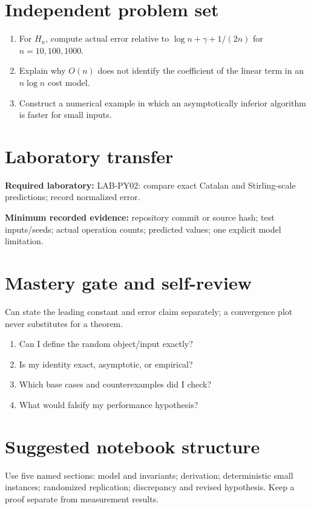 \documentclass[11pt]{article}
\begin{document}
\section{Independent problem set}
\begin{enumerate}
\item For $H_n$, compute actual error relative to $\log n+\gamma+1/(2n)$ for $n=10,100,1000$.
\item Explain why $O(n)$ does not identify the coefficient of the linear term in an $n\log n$ cost model.
\item Construct a numerical example in which an asymptotically inferior algorithm is faster for small inputs.
\end{enumerate}
\section{Laboratory transfer}
\textbf{Required laboratory:} LAB-PY02: compare exact Catalan and Stirling-scale predictions; record normalized error.\par
\noindent\textbf{Minimum recorded evidence:} repository commit or source hash; test inputs/seeds; actual operation counts; predicted values; one explicit model limitation.\par
\section{Mastery gate and self-review}
Can state the leading constant and error claim separately; a convergence plot never substitutes for a theorem.\par
\begin{enumerate}\item Can I define the random object/input exactly? \item Is my identity exact, asymptotic, or empirical? \item Which base cases and counterexamples did I check? \item What would falsify my performance hypothesis?\end{enumerate}
\section{Suggested notebook structure}
Use five named sections: model and invariants; derivation; deterministic small instances; randomized replication; discrepancy and revised hypothesis. Keep a proof separate from measurement results.
\end{document}
